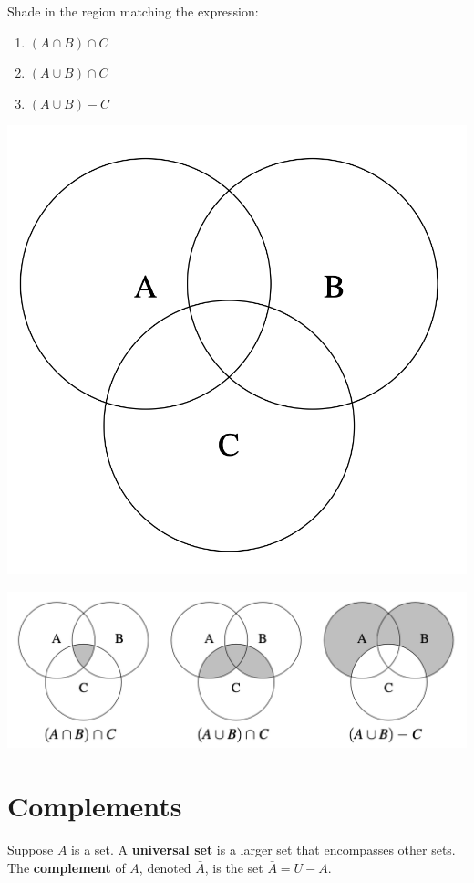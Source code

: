 \documentclass[
  letterpaper,
  DIV=11,
  numbers=noendperiod]{scrreprt}
\providecommand{\tightlist}{%
  \setlength{\itemsep}{0pt}\setlength{\parskip}{0pt}}\usepackage{longtable,booktabs,array}
\begin{document}
Shade in the region matching the expression:

\begin{enumerate}
\def\labelenumi{\arabic{enumi}.}
\tightlist
\item
  \((A \cap B) \cap C\)
\item
  \((A \cup B) \cap C\)
\item
  \((A \cup B) - C\)
\end{enumerate}

\includegraphics[width=0.35\linewidth,height=\textheight,keepaspectratio]{lecture2/images/union-intersection-complement-ex.png}

\begin{tcolorbox}[enhanced jigsaw, toprule=.15mm, leftrule=.75mm, coltitle=black, left=2mm, opacityback=0, titlerule=0mm, arc=.35mm, toptitle=1mm, opacitybacktitle=0.6, bottomtitle=1mm, colframe=quarto-callout-tip-color-frame, title=\textcolor{quarto-callout-tip-color}{\faLightbulb}\hspace{0.5em}{Solution}, rightrule=.15mm, bottomrule=.15mm, colbacktitle=quarto-callout-tip-color!10!white, breakable, colback=white]

\includegraphics[width=0.75\linewidth,height=\textheight,keepaspectratio]{lecture2/images/union-intersection-complement-ans.png}

\end{tcolorbox}

\section{Complements}\label{complements}

Suppose \(A\) is a set. A \textbf{universal set} is a larger set that
encompasses other sets. The \textbf{complement} of \(A\), denoted
\(\bar{A}\), is the set \(\bar{A} = U - A\).
\end{document}
